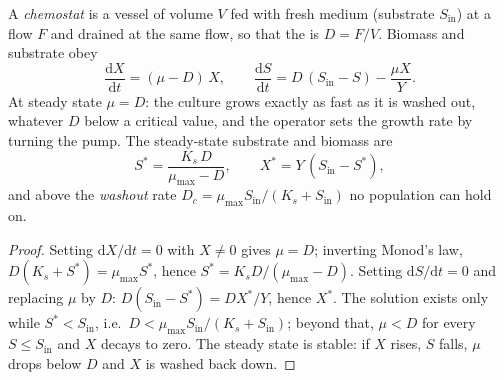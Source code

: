 \begin{theorem}\label{thm:b2:microbial-metabolism:chemostat}
A \emph{chemostat} is a vessel of volume $V$ fed with fresh medium
(substrate $S_{\text{in}}$) at a flow $F$ and drained at the same
flow, so that the \emph{} is $D = F/V$. Biomass and
substrate obey
\[
\frac{\mathrm{d}X}{\mathrm{d}t} = (\mu - D)\,X, \qquad
\frac{\mathrm{d}S}{\mathrm{d}t} = D\,(S_{\text{in}} - S) - \frac{\mu X}{Y}.
\]
At steady state $\mu = D$: the culture grows exactly as fast as it is
washed out, whatever $D$ below a critical value, and the operator
sets the growth rate by turning the pump. The steady-state
substrate and biomass are
\[
S^* = \frac{K_s\,D}{\mu_{\max} - D}, \qquad X^* = Y\,(S_{\text{in}} - S^*),
\]
and above the \emph{washout} rate $D_c = \mu_{\max}
S_{\text{in}}/(K_s + S_{\text{in}})$ no population can hold on.
\end{theorem}
\begin{proof}
Setting $\mathrm{d}X/\mathrm{d}t = 0$ with $X \neq 0$ gives $\mu = D$;
inverting Monod's law, $D(K_s + S^*) = \mu_{\max} S^*$, hence $S^* =
K_s D/(\mu_{\max} - D)$. Setting $\mathrm{d}S/\mathrm{d}t = 0$ and
replacing $\mu$ by $D$: $D(S_{\text{in}} - S^*) = DX^*/Y$, hence
$X^*$. The solution exists only while $S^* < S_{\text{in}}$, i.e.\
$D < \mu_{\max} S_{\text{in}}/(K_s + S_{\text{in}})$; beyond that,
$\mu < D$ for every $S \le S_{\text{in}}$ and $X$ decays to zero. The
steady state is stable: if $X$ rises, $S$ falls, $\mu$ drops below
$D$ and $X$ is washed back down.
\end{proof}

